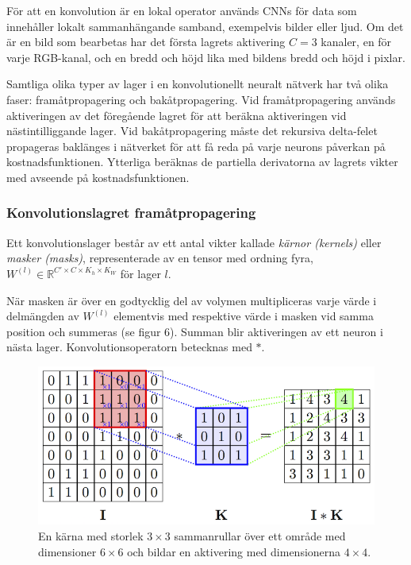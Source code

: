 \documentclass[a4paper,11pt,twoside]{article}
\begin{document}
För att en konvolution är en lokal operator används CNNs för data som innehåller lokalt sammanhängande samband, exempelvis bilder eller ljud. Om det är en bild som bearbetas har det första lagrets aktivering $C = 3$ kanaler, en för varje RGB-kanal, och en bredd och höjd lika med bildens bredd och höjd i pixlar. \cite{cs231n} \cite{convmath}

Samtliga olika typer av lager i en konvolutionellt neuralt nätverk har två olika faser: framåtpropagering och bakåtpropagering. Vid framåtpropagering används aktiveringen av det föregående lagret för att beräkna aktiveringen vid nästintilliggande lager. Vid bakåtpropagering måste det rekursiva delta-felet propageras baklänges i nätverket för att få reda på varje neurons påverkan på kostnadsfunktionen. Ytterliga beräknas de partiella derivatorna av lagrets vikter med avseende på kostnadsfunktionen. \cite{cs231n}

\subsubsection{Konvolutionslagret framåtpropagering}
Ett konvolutionslager består av ett antal vikter kallade \textit{kärnor (kernels)} eller \textit{masker (masks)}, representerade av en tensor med ordning fyra, $W^{(l)} \in \mathbb{R}^{C' \times C  \times K_h \times K_W}$ för lager $l$. \cite{cs231n} \cite{convmath}

När masken är över en godtycklig del av volymen multipliceras varje värde i delmängden av $W^{(l)}$ elementvis med respektive värde i masken vid samma position och summeras (se figur 6). Summan blir aktiveringen av ett neuron i nästa lager. Konvolutionsoperatorn betecknas med $*$. \cite{cs231n} \cite{convmath}

\begin{figure}[h]\label{figkonv}
	\centering
  		\includegraphics[scale=2.1]{convolution.png}
  	\caption{En kärna med storlek $3 \times 3$ sammanrullar över ett område med dimensioner $6 \times 6$ och bildar en aktivering med dimensionerna $4 \times 4$. \cite{figkonv}}
\end{figure}
\end{document}
